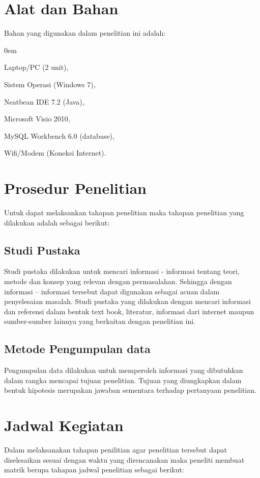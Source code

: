 \documentclass{jtetiproposalskripsi}
\begin{document}
\section{Alat dan Bahan}
Bahan yang digunakan dalam penelitian ini adalah:

\vspace{-0.5cm}

\begin{enumerate}[a.]
\begin{singlespace}
\itemsep0em
\item Laptop/PC (2 unit),
\item Sistem Operasi (Windows 7),
\item Neatbean IDE 7.2 (Java),
\item Microsoft Visio 2010,
\item MySQL Workbench 6.0 (database),
\item Wifi/Modem (Koneksi Internet).
\end{singlespace}
\end{enumerate}

\section{Prosedur Penelitian}

Untuk dapat melaksankan tahapan penelitian maka tahapan penelitian yang dilakukan adalah sebagai berikut: 
\subsection{Studi Pustaka}

Studi pustaka dilakukan untuk mencari informasi - informasi tentang teori, metode dan konsep yang relevan dengan permasalahan. Sehingga dengan informasi – informasi tersebut dapat digunakan sebagai acuan dalam penyelesaian masalah. Studi pustaka yang dilakukan dengan mencari informasi dan referensi dalam bentuk text book, literatur, informasi dari internet maupun sumber-sumber lainnya yang berkaitan dengan penelitian ini.

\subsection{Metode Pengumpulan data}
Pengumpulan data dilakukan untuk memperoleh informasi yang dibutuhkan dalam rangka mencapai tujuan penelitian. Tujuan yang diungkapkan dalam bentuk hipotesis merupakan jawaban sementara terhadap pertanyaan penelitian.


\section{Jadwal Kegiatan}
Dalam melaksanakan tahapan penilitian agar penelitian tersebut dapat diselesaikan sesuai dengan waktu yang direncanakan maka peneliti membuat matrik berupa tahapan jadwal penelitian sebagai berikut:
\end{document}
